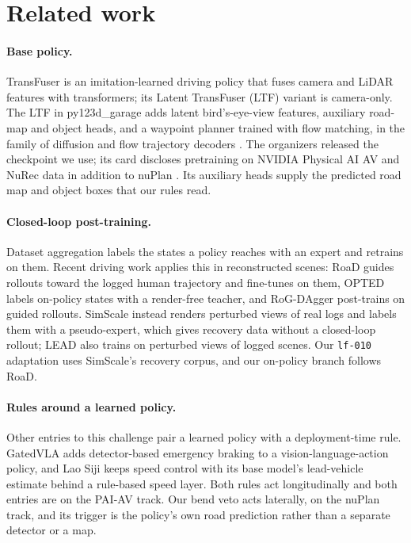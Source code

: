 \documentclass{article}
\begin{document}
\section{Related work}
\paragraph{Base policy.}
TransFuser \cite{transfuser} is an imitation-learned driving policy that fuses camera and LiDAR features with transformers; its Latent TransFuser (LTF) variant is camera-only. The LTF in py123d\_garage \cite{garage,weights} adds latent bird's-eye-view features, auxiliary road-map and object heads, and a waypoint planner trained with flow matching, in the family of diffusion and flow trajectory decoders \cite{diffusiondrive,diffplanner,wamflow}. The organizers released the checkpoint we use; its card discloses pretraining on NVIDIA Physical AI AV and NuRec data \cite{nvidiadata} in addition to nuPlan \cite{nuplan,openscene}. Its auxiliary heads supply the predicted road map and object boxes that our rules read.

\paragraph{Closed-loop post-training.}
Dataset aggregation \cite{dagger} labels the states a policy reaches with an expert and retrains on them. Recent driving work applies this in reconstructed scenes: RoaD \cite{road} guides rollouts toward the logged human trajectory and fine-tunes on them, OPTED \cite{opted} labels on-policy states with a render-free teacher, and RoG-DAgger \cite{rogdagger} post-trains on guided rollouts. SimScale \cite{simscale} instead renders perturbed views of real logs and labels them with a pseudo-expert, which gives recovery data without a closed-loop rollout; LEAD \cite{lead} also trains on perturbed views of logged scenes. Our \texttt{lf-010} adaptation uses SimScale's recovery corpus, and our on-policy branch follows RoaD.

\paragraph{Rules around a learned policy.}
Other entries to this challenge pair a learned policy with a deployment-time rule. GatedVLA \cite{gatedvla} adds detector-based emergency braking to a vision-language-action policy, and Lao Siji \cite{laosiji} keeps speed control with its base model's lead-vehicle estimate behind a rule-based speed layer. Both rules act longitudinally and both entries are on the PAI-AV track. Our bend veto acts laterally, on the nuPlan track, and its trigger is the policy's own road prediction rather than a separate detector or a map.
\end{document}
